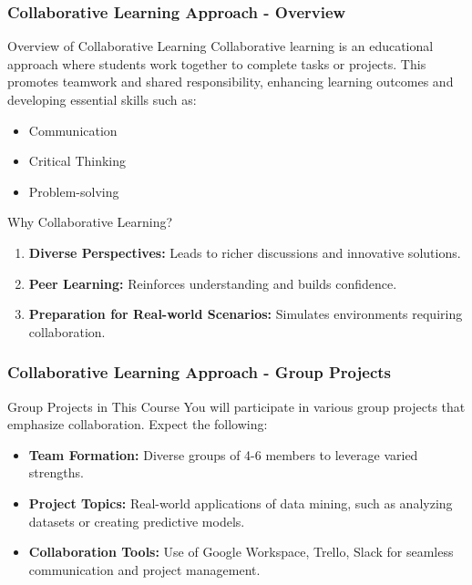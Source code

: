 \documentclass[aspectratio=169]{beamer}
\begin{document}
\begin{frame}[fragile]
    \frametitle{Collaborative Learning Approach - Overview}
    \begin{block}{Overview of Collaborative Learning}
        Collaborative learning is an educational approach where students work together to complete tasks or projects. This promotes teamwork and shared responsibility, enhancing learning outcomes and developing essential skills such as:
        \begin{itemize}
            \item Communication
            \item Critical Thinking
            \item Problem-solving
        \end{itemize}
    \end{block}
    
    \begin{block}{Why Collaborative Learning?}
        \begin{enumerate}
            \item \textbf{Diverse Perspectives:}  Leads to richer discussions and innovative solutions.
            \item \textbf{Peer Learning:} Reinforces understanding and builds confidence.
            \item \textbf{Preparation for Real-world Scenarios:} Simulates environments requiring collaboration.
        \end{enumerate}
    \end{block}
\end{frame}

\begin{frame}[fragile]
    \frametitle{Collaborative Learning Approach - Group Projects}
    \begin{block}{Group Projects in This Course}
        You will participate in various group projects that emphasize collaboration. Expect the following:
        \begin{itemize}
            \item \textbf{Team Formation:} Diverse groups of 4-6 members to leverage varied strengths.
            \item \textbf{Project Topics:} Real-world applications of data mining, such as analyzing datasets or creating predictive models.
            \item \textbf{Collaboration Tools:} Use of Google Workspace, Trello, Slack for seamless communication and project management.
        \end{itemize}
    \end{block}
\end{frame}
\end{document}
